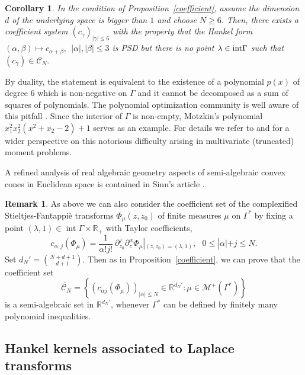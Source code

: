 \documentclass[11pt,reqno]{amsart}
\theoremstyle{plain}
\newtheorem{corollary}[theorem]{Corollary}
\theoremstyle{definition}
\newtheorem{remark}[theorem]{Remark}
\numberwithin{equation}{section}
\begin{document}
	\begin{corollary} In the condition of Proposition~\ref{coefficient}, assume the dimension $d$ of the underlying space is bigger than $1$ and choose $N \geq 6.$ Then, there exists a
	coefficient system $(c_\gamma)_{|\gamma| \leq 6}$ with the property that the Hankel form $(\alpha, \beta) \mapsto c_{\alpha+\beta}, \ \ |\alpha|, |\beta| \leq 3$ is PSD but there is no point $\lambda \in {\rm int \Gamma}$ such that $(c_\gamma) \in {\mathcal{C}_N }.$
	\end{corollary} 
	
	By duality, the statement is equivalent to the existence of a polynomial $p(x)$ of degree $6$ which is non-negative on $\Gamma$ and it cannot be decomposed as a sum of squares of polynomials. The polynomial optimization community is well aware of this pitfall \cite{NP}. Since the interior of $\Gamma$ is non-empty, Motzkin's polynomial $x_1^2 x_2^2 (x^2 + x_2 - 2) + 1$ serves as an example. For details we refer to \cite[Chapter 17]{Schmudgen-book} and \cite{Evelyne,Mourrain,MS16} for a wider perspective on this notorious difficulty arising in multivariate (truncated) moment problems.
	
	
	A refined analysis of real algebraic geometry aspects of semi-algebraic convex cones in Euclidean space is contained in Sinn's article \cite{Sinn}.
    
   
\begin{remark}
    As above we can also consider the coefficient set of the complexified Stieltjes-Fantappi\`e transforms $\Phi_\mu(z, z_0)$ of finite measures $\mu$ on $\Gamma^*$ by fixing a point $(\lambda, 1) \in \operatorname{int} \Gamma \times \mathbb{R}_+$ with Taylor coefficients,
$$
c_{\alpha, j} (\Phi_\mu) = \frac{1}{\alpha! j !} \ \partial^j_{z_0} \partial_z^\alpha \Phi_\mu |_{(z, z_0)=(\lambda, 1)}, \ \ \ 0 \leq |\alpha|+ j \leq N. 
$$
Set $d_N' = \binom{N+ d+1}{d+1}$. Then as in Proposition~\ref{coefficient}, we can prove that the coefficient set 
	$$
	 \widetilde{\mathcal{C}_N } = \left \lbrace  (c_{\alpha j} (\Phi_\mu))_{|\alpha | \leq N} \in \mathbb{R}^{d_N'} : \mu \in \mathcal{M}^+(\Gamma^*) \right \rbrace
	$$
	is a semi-algebraic set in $\mathbb{R}^{d_N'}$, whenever $\Gamma^*$ can be defined by finitely many polynomial inequalities.
\end{remark}
	
	
	\subsection{Hankel kernels associated to Laplace transforms} \label{Subsec:flat-Laplace}
\end{document}
